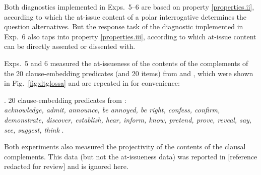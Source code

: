 \documentclass[times,linguex]{glossa}
\begin{document}
Both diagnostics implemented in Exps.~5--6 are based on property \ref{properties.ii}, according to which the at-issue content of a polar interrogative determines the question alternatives. But the response task of the diagnostic implemented in Exp.~6 also taps into property \ref{properties.iii}, according to which at-issue content can be directly assented or dissented with. 


Exps.~5 and 6 measured the at-issueness of the contents of the complements of the 20 clause-embedding predicates (and 20 items) from \citealt{degen_are_2022} and \citealt{degen_projection_2025}, which were shown in Fig.~\ref{fig:dtglossa} and are repeated in \Next for convenience:

\ex. \label{ex:predicates}
20 clause-embedding predicates from \citealt{degen_projection_2025}: \\
\emph{acknowledge,  admit, announce, be annoyed, be right, confess, confirm, demonstrate, discover, establish, hear, inform, know, pretend, prove, reveal, say, see, suggest, think}
\z. 

Both experiments also measured the projectivity of the contents of the clausal complements. This data (but not the at-issueness data) was reported in [reference redacted for review] %
and is ignored here.

\end{document}
